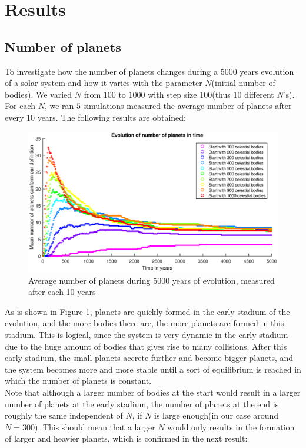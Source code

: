 \section{Results}

\subsection{Number of planets}
To investigate how the number of planets changes during a $5000$ years evolution of a solar system and how it varies with the parameter $N$(initial number of bodies). 
We varied $N$ from $100$ to $1000$ with step size $100$(thus $10$ different $N$'s). 
For each $N$, we ran $5$ simulations measured the average number of planets after every $10$ years. The following results are obtained:

\begin{figure}[H]
\centering
\includegraphics[scale=0.8]{APgrafiek.eps}
\caption{Average number of planets during 5000 years of evolution, measured after each 10 years}
    \label{fig:AantPlaneten}
\end{figure}

As is shown in Figure \ref{fig:AantPlaneten}, planets are quickly formed in the early stadium of the evolution, and the more bodies there are, the more planets are formed in this stadium. 
This is logical, since the system is very dynamic in the early stadium due to the huge amount of bodies that gives rise to many collisions. 
After this early stadium, the small planets accrete further and become bigger planets, and the system becomes more and more stable until a sort of equilibrium is reached in which the number of planets is constant.\\

Note that although a larger number of bodies at the start would result in a larger number of planets at the early stadium, the number of planets at the end is roughly the same independent of $N$, if $N$ is large enough(in our case around $N=300$). 
This should mean that a larger $N$ would only results in the formation of larger and heavier planets, which is confirmed in the next result:


